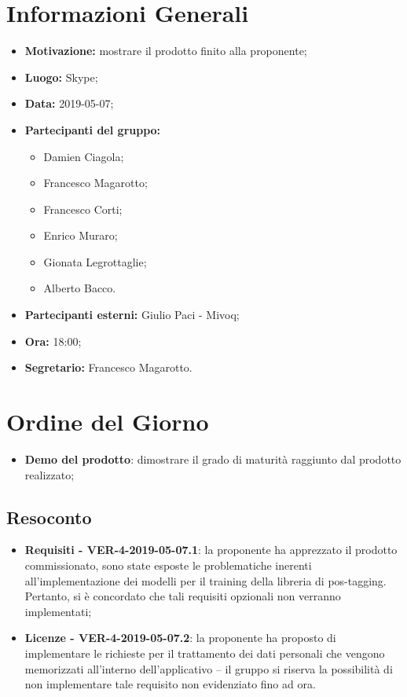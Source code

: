 \documentclass[a4paper, oneside, openany, dvipsnames, table]{article}
\begin{document}
\copertina{}


\newpage
\tableofcontents
\newpage
\section{Informazioni Generali}
\begin{itemize}
\item \textbf{Motivazione:} mostrare il prodotto finito alla proponente;
\item \textbf{Luogo:} Skype;
\item \textbf{Data:} 2019-05-07;
\item \textbf{Partecipanti del gruppo:} \hfill
	\begin{itemize}
	\item Damien Ciagola;
	\item Francesco Magarotto;
	\item Francesco Corti;
	\item Enrico Muraro; 
	\item Gionata Legrottaglie;
	\item Alberto Bacco.
	\end{itemize} 
\item \textbf{Partecipanti esterni:} Giulio Paci - Mivoq;
\item \textbf{Ora:} 18:00;
\item \textbf{Segretario:} Francesco Magarotto.
\end{itemize}

\section{Ordine del Giorno}
\begin{itemize}
		\item \textbf{Demo del prodotto}: dimostrare il grado di maturità raggiunto dal prodotto realizzato;
\end{itemize}

\subsection{Resoconto}
\begin{itemize}
	\item \textbf{Requisiti - VER-4-2019-05-07.1}: la proponente ha apprezzato il prodotto commissionato, sono state esposte le problematiche inerenti all'implementazione dei modelli per il training della libreria di pos-tagging. Pertanto, si è concordato che tali requisiti opzionali non verranno implementati;
	\item \textbf{Licenze - VER-4-2019-05-07.2}: la proponente ha proposto di implementare le richieste per il trattamento dei dati personali che vengono memorizzati all'interno dell'applicativo -- il gruppo si riserva la possibilità di non implementare tale requisito non evidenziato fino ad ora.
\end{itemize}
\end{document}
